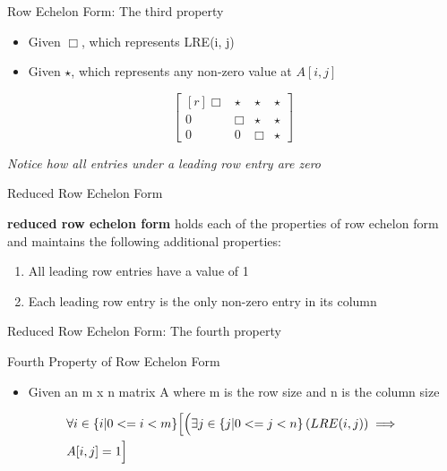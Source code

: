 \documentclass{beamer}
\begin{document}
\begin{frame}{Row Echelon Form: The third property}
  \begin{example}
    \begin{itemize}
      \item Given $\Box$, which represents LRE(i, j)
      \item Given $\star$, which represents any non-zero value at $A[i, j]$
    \end{itemize}
    \begin{equation}
      \begin{bmatrix*}[r]
        \Box & \star & \star & \star \\
        0 & \Box & \star & \star \\
        0 & 0 & \Box & \star 
      \end{bmatrix*}
    \end{equation}

    \textit{Notice how all entries under a leading row entry are zero}
  \end{example}
\end{frame}

\begin{frame}{Reduced Row Echelon Form}
  \begin{definition}
    \textbf{reduced row echelon form} holds each of the properties of row echelon form and maintains
    the following additional properties:
    \begin{enumerate}
      \item All leading row entries have a value of 1
      \item Each leading row entry is the only non-zero entry in its column 
    \end{enumerate}
  \end{definition}
\end{frame}

\begin{frame}{Reduced Row Echelon Form: The fourth property}
  \begin{block}{Fourth Property of Row Echelon Form}
    \begin{itemize}
    \item Given an m x n matrix A where m is the row size and n is the column size
    \end{itemize}
    \begin{equation}
      \begin{split}
        &\forall i \in \{i | 0 <= i < m \} \Bigl[ \Bigl( \exists j \in \{j | 0 <= j < n \} \left( LRE(i, j) \right) \implies \Bigr. \\
        &\Bigl. A[i, j] = 1 \Bigr] \\
      \end{split}
    \end{equation}
  \end{block}
\end{frame}
\end{document}
